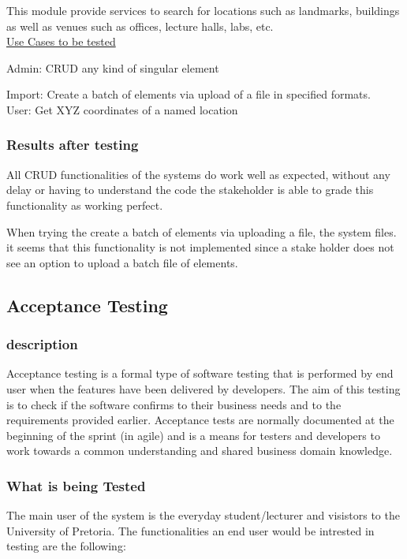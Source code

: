 \documentclass[12pt]{article}
\begin{document}
		This module provide services to search for locations such as landmarks, buildings as
		well as venues such as offices, lecture halls, labs, etc.\\
		
		\underline{Use Cases to be tested}
		
		Admin:
			CRUD any kind of singular element

			Import: Create a batch of elements via upload of a file in specified formats.\\

		User:
		Get XYZ coordinates of a named location
		
		\subsubsection{Results after testing}
		
		All CRUD functionalities of the systems do work well as expected, without any delay or having to understand the code the stakeholder is able to grade this functionality as working perfect.
		
		When trying the create a batch of elements via uploading  a file, the system files. it seems that this functionality is not implemented since a stake holder does not see an option to upload a batch file of elements.
		
		
		
	
	\subsection{Acceptance Testing}
		\subsubsection{description}
		Acceptance testing is a formal type of software testing that is performed by end user when the features have been 			delivered by developers. The aim of this testing is to check if the software confirms to their business needs and to the 		 requirements provided earlier. Acceptance tests are normally documented at the beginning of the sprint (in agile) and is 		  a means for testers and developers to work towards a common understanding and shared business domain knowledge.
		\subsubsection{What is being Tested}
		The main user of the system is the everyday student/lecturer and visistors to the University of Pretoria. The 
		functionalities an end user would be intrested in testing are the following:
		
\end{document}
